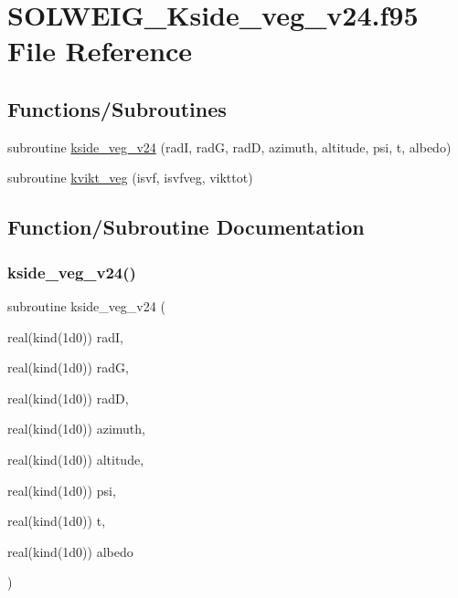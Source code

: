 \hypertarget{_s_o_l_w_e_i_g___kside__veg__v24_8f95}{}\section{S\+O\+L\+W\+E\+I\+G\+\_\+\+Kside\+\_\+veg\+\_\+v24.\+f95 File Reference}
\label{_s_o_l_w_e_i_g___kside__veg__v24_8f95}
\subsection*{Functions/\+Subroutines}
\begin{DoxyCompactItemize}
\item 
subroutine \hyperlink{_s_o_l_w_e_i_g___kside__veg__v24_8f95_a3e008823145af180ffc924782b480545}{kside\+\_\+veg\+\_\+v24} (radI, radG, radD, azimuth, altitude, psi, t, albedo)
\item 
subroutine \hyperlink{_s_o_l_w_e_i_g___kside__veg__v24_8f95_a9ed9001e5e9b8790be486a97a1cde4f9}{kvikt\+\_\+veg} (isvf, isvfveg, vikttot)
\end{DoxyCompactItemize}


\subsection{Function/\+Subroutine Documentation}
\mbox{\label{_s_o_l_w_e_i_g___kside__veg__v24_8f95_a3e008823145af180ffc924782b480545}} 
\subsubsection{\texorpdfstring{kside\+\_\+veg\+\_\+v24()}{kside\_veg\_v24()}}
{\footnotesize\ttfamily subroutine kside\+\_\+veg\+\_\+v24 (\begin{DoxyParamCaption}\item[{real(kind(1d0))}]{radI,  }\item[{real(kind(1d0))}]{radG,  }\item[{real(kind(1d0))}]{radD,  }\item[{real(kind(1d0))}]{azimuth,  }\item[{real(kind(1d0))}]{altitude,  }\item[{real(kind(1d0))}]{psi,  }\item[{real(kind(1d0))}]{t,  }\item[{real(kind(1d0))}]{albedo }\end{DoxyParamCaption})}



